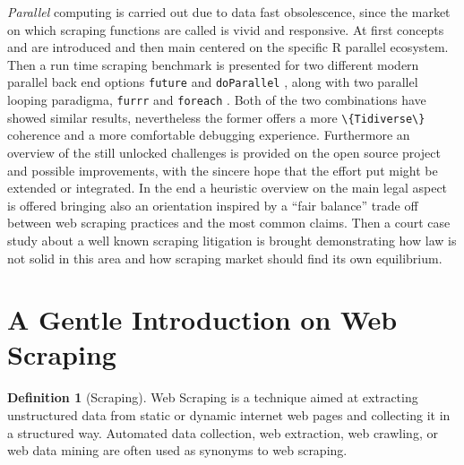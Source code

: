 \documentclass[
  12pt,
  a4paper,
  oneside]{book}
\newcommand{\passthrough}[1]{#1}
\theoremstyle{definition}
\newtheorem{definition}{Definition}[chapter]
\theoremstyle{definition}
\theoremstyle{definition}
\theoremstyle{remark}
\begin{document}
\emph{Parallel} computing is carried out due to data fast obsolescence, since the market on which scraping functions are called is vivid and responsive. At first concepts and are introduced and then main centered on the specific R parallel ecosystem. Then a run time scraping benchmark is presented for two different modern parallel back end options \passthrough{\lstinline!future!} \citet{future} and \passthrough{\lstinline!doParallel!} \citet{doParallel}, along with two parallel looping paradigma, \passthrough{\lstinline!furrr!} \citet{furrr} and \passthrough{\lstinline!foreach!} \citet{foreach}. Both of the two combinations have showed similar results, nevertheless the former offers a more \passthrough{\lstinline!\{Tidiverse\}!} coherence and a more comfortable debugging experience.
Furthermore an overview of the still unlocked challenges is provided on the open source project and possible improvements, with the sincere hope that the effort put might be extended or integrated. In the end a heuristic overview on the main legal aspect is offered bringing also an orientation inspired by a ``fair balance'' trade off between web scraping practices and the most common claims. Then a court case study about a well known scraping litigation is brought demonstrating how law is not solid in this area and how scraping market should find its own equilibrium.

\hypertarget{reverse}{%
\section{A Gentle Introduction on Web Scraping}\label{reverse}}

\begin{definition}[Scraping]
\protect\hypertarget{def:scraping}{}{\label{def:scraping} {} }Web Scraping is a technique aimed at extracting unstructured data from static or dynamic internet web pages and collecting it in a structured way.
Automated data collection, web extraction, web crawling, or web data mining are often used as synonyms to web scraping.
\end{definition}
\end{document}

